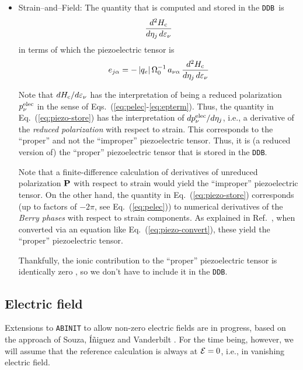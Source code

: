 \documentclass[11pt,fleqn]{article}
\def\beq{\begin{equation}}
\def\eeq{\end{equation}}
\def\E{{\cal E}}
\def\Oo{\Omega_0}
\def\bc{_{\rm c}}
\def\veps{\varepsilon}
\def\DDB{{\tt DDB}}
\begin{document}
\begin{itemize}
\item Strain--and--Field:
%
The quantity that is computed and stored in the \DDB\ is
%
\beq
{d^2H\bc \over d\eta_j\,d\veps_\nu}
\label{eq:piezo-store}
\eeq
%
in terms of which the piezoelectric tensor is
%
\beq
e_{j\alpha}=-\,|q_e|\,\Oo^{-1}\,a_{\nu\alpha}\,
{d^2H\bc \over d\eta_j\,d\veps_\nu}
\label{eq:piezo-convert}
\eeq
%

Note that $dH\bc/d\veps_\nu$ has the interpretation
of being a reduced polarization $p_\nu^{\rm elec}$ in the sense
of Eqs.~(\ref{eq:pelec}-\ref{eq:epterm}).  Thus, the quantity
in Eq.~(\ref{eq:piezo-store}) has the interpretation of
$dp_\nu^{\rm elec}/d\eta_j$, i.e., a derivative of the {\it reduced
polarization} with respect to strain.
This corresponds \cite{dv-piezo} to the ``proper'' and not
the ``improper'' piezoelectric tensor.  Thus, it is (a reduced
version of) the ``proper'' piezoelectric tensor that is stored
in the \DDB.

Note that a finite-difference calculation
of derivatives of unreduced polarization $\bf P$ with respect
to strain would yield the ``improper'' piezoelectric tensor.
On the other hand, the quantity in Eq.~(\ref{eq:piezo-store})
corresponds (up to factors of $-2\pi$, see Eq.~(\ref{eq:pelec}))
to numerical derivatives of the {\it Berry phases} with
respect to strain components.  As explained in Ref.~\cite{dv-piezo},
when converted via an equation like Eq.~(\ref{eq:piezo-convert}),
these yield the ``proper'' piezoelectric tensor.

Thankfully, the ionic contribution to the ``proper'' piezoelectric
tensor is identically zero \cite{dv-piezo}, so we don't have to
include it in the \DDB.


\end{itemize}

\subsection{Electric field}

Extensions to {\tt ABINIT} to allow non-zero electric fields are in
progress, based on the approach of Souza, \'I\~niguez and
Vanderbilt \cite{souza-ef}.  For the time being, however, we will
assume that the reference calculation is always at $\E=0$, i.e., in
vanishing electric field.
\end{document}

